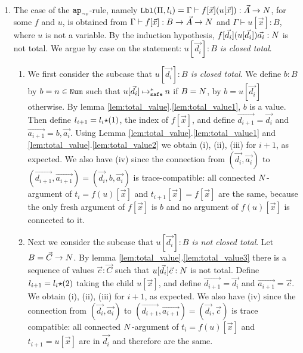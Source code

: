 \documentclass{article}
\newenvironment{proof}[1][Proof]{\begin{trivlist}
\item[\hskip \labelsep {\bfseries #1}]}{\end{trivlist}}
\begin{document}
\begin{proof}
\begin{enumerate}
\item
  The case of the ${{\tt ap}_{\mbox{\tiny $\neg v$}}}$-rule, namely 
  ${\tt Lbl}(\Pi,l_i) = \Gamma\vdash f[\vec{x}](u[\vec{x}]): \vec{A}\rightarrow{N}$, 
  for some $f$ and $u$, is obtained from $\Gamma\vdash f[\vec{x}]: B \rightarrow \vec{A}\rightarrow{N}$ 
  and $\Gamma\vdash u[\vec{x}]: B$, where $u$ is not a variable.
  By the induction hypothesis, $f[\vec{d_i}](u[\vec{d_i}])\vec{a_i}:{N}$ is not total.
  We argue by case on the statement: \emph{$u[\vec{d_i}]:B$ is closed total}.

\begin{enumerate}
\item
  We first consider the subcase that \emph{$u[\vec{d_i}]:B$ is closed total}.
  We define $b:B$ by $b = n\in{\tt Num}$ such that $u[\vec{d_i}] \mathbin{\mathbin{\mapsto}_{\hbox{\scriptsize \tt safe}}^*} n$ if $B={N}$,
  by $b = u[\vec{d_i}]$ otherwise. By lemma \ref{lem:total_value}.\ref{lem:total_value1}, $b$ is a value.
  Then define $l_{i+1}=l_i{\star}(1)$, the index of $f[\vec{x}]$,
  and define $\vec{d_{i+1}} = \vec{d_i}$ and $\vec{a_{i+1}} = b,\vec{a_i}$. 
  Using Lemma \ref{lem:total_value}.\ref{lem:total_value1} and \ref{lem:total_value}.\ref{lem:total_value2}
  we obtain (i), (ii), (iii) for $i+1$, as expected. 
  We also have (iv) since the connection from 
  $(\vec{d_i},\vec{a_i})$ to $(\vec{d_{i+1}},\vec{a_{i+1}}) = (\vec{d_i},b,\vec{a_i})$ is
  trace-compatible: all connected 
  ${N}$-argument of $t_{i}=f(u)[\vec{x}]$ and $t_{i+1}[\vec{x}] = f[\vec{x}]$ are the same,
  because the only fresh argument of $f[\vec{x}]$ 
  is $b$ and no argument of $f(u)[\vec{x}]$ is connected to it.
\item
  Next we consider the subcase that \emph{$u[\vec{d_i}]:B$ is not closed total}.
  Let $B = \vec{C}\rightarrow{N}$.
  By lemma \ref{lem:total_value}.\ref{lem:total_value3}
  there is a sequence of values $\vec{c}:\vec{C}$ such that $u[\vec{d_i}]\vec{c}:{N}$ is not total.
  Define $l_{i+1}= l_i {\star} (2)$ taking the child $u[\vec{x}]$,
  and define $\vec{d_{i+1}} = \vec{d_i}$ and $\vec{a_{i+1}} = \vec{c}$. 
  We obtain (i), (ii), (iii) for $i+1$, as expected.
  We also have (iv) since the connection from 
  $(\vec{d_i},\vec{a_i})$ to $(\vec{d_{i+1}},\vec{a_{i+1}}) = (\vec{d_i},\vec{c})$ is
  trace compatible: all connected ${N}$-argument of $t_{i}=f(u)[\vec{x}]$ and $t_{i+1}=u[\vec{x}]$ are 
  in $\vec{d_i}$ and therefore are the same.
 \end{enumerate}


\end{enumerate}
\end{proof}
\end{document}
